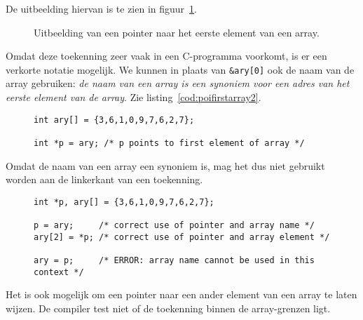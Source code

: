 De uitbeelding hiervan is te zien in figuur~\ref{fig:poifirstarray}.
%
\begin{figure}[!ht]
\centering
{}
\caption{Uitbeelding van een pointer naar het eerste element van een array.}
\label{fig:poifirstarray}
\end{figure}
%
Omdat deze toekenning zeer vaak in een C-programma voorkomt, is er een verkorte notatie mogelijk. We kunnen in plaats van \texttt{\&ary[0]} ook de naam van de array gebruiken: \textsl{de naam van een array is een synoniem voor een adres van het eerste element van de array}. Zie listing~\ref{cod:poifirstarray2}.

\begin{figure}[!ht]
\begin{lstlisting}[caption=Een pointer naar het eerste element van een array.,label=cod:poifirstarray2]
int ary[] = {3,6,1,0,9,7,6,2,7};

int *p = ary; /* p points to first element of array */
\end{lstlisting}
\end{figure}

Omdat de naam van een array een synoniem is, mag het dus niet gebruikt worden aan de linkerkant van een toekenning.

\begin{figure}[!ht]
\begin{lstlisting}[caption=Een pointer naar het eerste element van een array.,label=cod:poifirstarray3]
int *p, ary[] = {3,6,1,0,9,7,6,2,7};

p = ary;     /* correct use of pointer and array name */
ary[2] = *p; /* correct use of pointer and array element */

ary = p;     /* ERROR: array name cannot be used in this context */
\end{lstlisting}
\end{figure}

Het is ook mogelijk om een pointer naar een ander element van een array te laten wijzen. De compiler test niet of de toekenning binnen de array-grenzen ligt.

